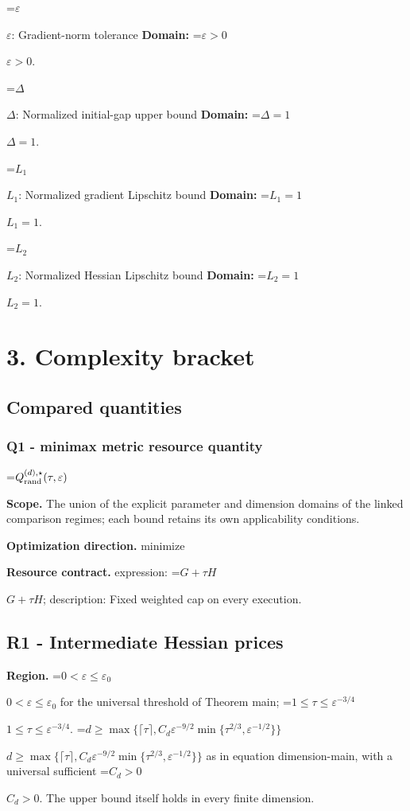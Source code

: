 \documentclass[10pt,a4paper]{article}
\newcommand{\AtlasMath}[1]{\par\begingroup\centering\setbox0=\hbox{$\displaystyle #1$}\ifdim\wd0>1.4\linewidth\typeout{ATLAS WIDE FORMULA: \the\wd0}\fi\ifdim\wd0>\linewidth\resizebox{\linewidth}{!}{\box0}\else\box0\fi\par\endgroup}
\newcommand{\AtlasInlineMath}[1]{\begingroup\setbox0=\hbox{$#1$}\ifdim\wd0>.4\linewidth\endgroup\AtlasMath{#1}\else\endgroup$#1$\fi}
\begin{document}
\AtlasInlineMath{\varepsilon}: Gradient-norm tolerance \textbf{Domain:} \AtlasInlineMath{\varepsilon>0}.



\AtlasInlineMath{\Delta}: Normalized initial-gap upper bound \textbf{Domain:} \AtlasInlineMath{\Delta=1}.



\AtlasInlineMath{L_1}: Normalized gradient Lipschitz bound \textbf{Domain:} \AtlasInlineMath{L_1=1}.



\AtlasInlineMath{L_2}: Normalized Hessian Lipschitz bound \textbf{Domain:} \AtlasInlineMath{L_2=1}.



\section{3. Complexity bracket}


\subsection{Compared quantities}


\subsubsection{Q1 - minimax metric resource quantity}


\AtlasMath{Q^{(d),\star}_{\rm rand}(\tau,\varepsilon)}


\textbf{Scope.} The union of the explicit parameter and dimension domains of the linked comparison regimes; each bound retains its own applicability conditions.



\textbf{Optimization direction.} minimize



\textbf{Resource contract.} expression: \AtlasInlineMath{G+\tau H}; description: Fixed weighted cap on every execution.



\subsection{R1 - Intermediate Hessian prices}


\textbf{Region.} \AtlasInlineMath{0<\varepsilon\le\varepsilon_0} for the universal threshold of Theorem main; \AtlasInlineMath{1\le\tau\le\varepsilon^{-3/4}}. \AtlasInlineMath{d\ge\max\{\lceil\tau\rceil,C_d\varepsilon^{-9/2}\min\{\tau^{2/3},\varepsilon^{-1/2}\}\}} as in equation dimension-main, with a universal sufficient \AtlasInlineMath{C_d>0}. The upper bound itself holds in every finite dimension.
\end{document}
